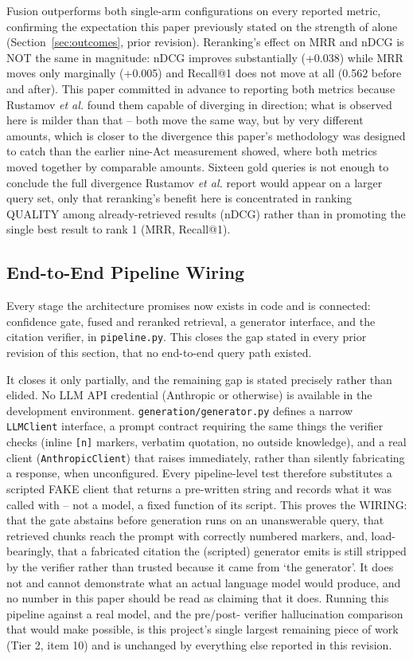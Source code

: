 \documentclass[conference]{IEEEtran}
\begin{document}
Fusion outperforms both single-arm configurations on every reported metric,
confirming the expectation this paper previously stated on the strength of
\cite{bolla2026,rustamov2025,sun2025} alone (Section~\ref{sec:outcomes}, prior
revision). Reranking's effect on MRR and nDCG is NOT the same in magnitude:
nDCG improves substantially (+0.038) while MRR moves only marginally
(+0.005) and Recall@1 does not move at all (0.562 before and after). This
paper committed in advance to reporting both metrics because Rustamov
\textit{et al.} found them capable of diverging in direction; what is
observed here is milder than that -- both move the same way, but by very
different amounts, which is closer to the divergence this paper's methodology
was designed to catch than the earlier nine-Act measurement showed, where
both metrics moved together by comparable amounts. Sixteen gold queries is
not enough to conclude the full divergence Rustamov \textit{et al.} report
would appear on a larger query set, only that reranking's benefit here is
concentrated in ranking QUALITY among already-retrieved results (nDCG) rather
than in promoting the single best result to rank 1 (MRR, Recall@1).

\subsection{End-to-End Pipeline Wiring}
\label{ssec:pipeline}

Every stage the architecture promises now exists in code and is connected:
confidence gate, fused and reranked retrieval, a generator interface, and the
citation verifier, in \texttt{pipeline.py}. This closes the gap stated in
every prior revision of this section, that no end-to-end query path existed.

It closes it only partially, and the remaining gap is stated precisely rather
than elided. No LLM API credential (Anthropic or otherwise) is available in
the development environment. \texttt{generation/generator.py} defines a
narrow \texttt{LLMClient} interface, a prompt contract requiring the same
things the verifier checks (inline \texttt{[n]} markers, verbatim quotation,
no outside knowledge), and a real client (\texttt{AnthropicClient}) that
raises immediately, rather than silently fabricating a response, when
unconfigured. Every pipeline-level test therefore substitutes a scripted FAKE
client that returns a pre-written string and records what it was called with
-- not a model, a fixed function of its script. This proves the WIRING: that
the gate abstains before generation runs on an unanswerable query, that
retrieved chunks reach the prompt with correctly numbered markers, and,
load-bearingly, that a fabricated citation the (scripted) generator emits is
still stripped by the verifier rather than trusted because it came from
`the generator'. It does not and cannot demonstrate what an actual language
model would produce, and no number in this paper should be read as claiming
that it does. Running this pipeline against a real model, and the pre/post-
verifier hallucination comparison that would make possible, is this project's
single largest remaining piece of work (Tier 2, item 10) and is unchanged by
everything else reported in this revision.
\end{document}
